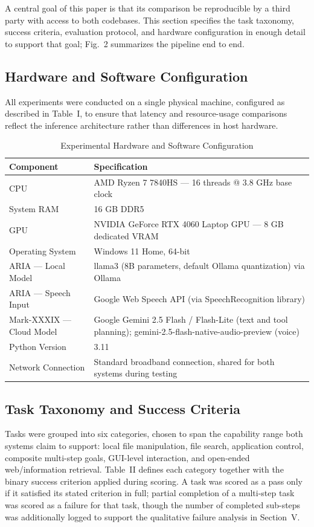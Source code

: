 \documentclass[conference]{IEEEtran}
\begin{document}
A central goal of this paper is that its comparison be reproducible by a third party with access to both codebases. This section specifies the task taxonomy, success criteria, evaluation protocol, and hardware configuration in enough detail to support that goal; Fig.~2 summarizes the pipeline end to end.

\subsection{Hardware and Software Configuration}

All experiments were conducted on a single physical machine, configured as described in Table~I, to ensure that latency and resource-usage comparisons reflect the inference architecture rather than differences in host hardware.

\begin{table}[htbp]
\caption{Experimental Hardware and Software Configuration}
\label{tab:hw}
\centering
\begin{tabular}{p{2.2cm}p{5.3cm}}
\toprule
\textbf{Component} & \textbf{Specification} \\
\midrule
CPU & AMD Ryzen 7 7840HS --- 16 threads @ 3.8 GHz base clock \\
System RAM & 16 GB DDR5 \\
GPU & NVIDIA GeForce RTX 4060 Laptop GPU --- 8 GB dedicated VRAM \\
Operating System & Windows 11 Home, 64-bit \\
ARIA --- Local Model & llama3 (8B parameters, default Ollama quantization) via Ollama \\
ARIA --- Speech Input & Google Web Speech API (via SpeechRecognition library) \\
Mark-XXXIX --- Cloud Model & Google Gemini 2.5 Flash / Flash-Lite (text and tool planning); gemini-2.5-flash-native-audio-preview (voice) \\
Python Version & 3.11 \\
Network Connection & Standard broadband connection, shared for both systems during testing \\
\bottomrule
\end{tabular}
\end{table}

\subsection{Task Taxonomy and Success Criteria}

Tasks were grouped into six categories, chosen to span the capability range both systems claim to support: local file manipulation, file search, application control, composite multi-step goals, GUI-level interaction, and open-ended web/information retrieval. Table~II defines each category together with the binary success criterion applied during scoring. A task was scored as a pass only if it satisfied its stated criterion in full; partial completion of a multi-step task was scored as a failure for that task, though the number of completed sub-steps was additionally logged to support the qualitative failure analysis in Section~V.
\end{document}
